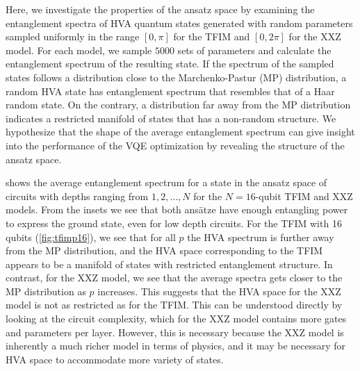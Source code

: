 \documentclass[
 aps,
 pra,
 showpacs,
 showkeys,
 superscriptaddress,
 reprint,%
twocolumn,
]{revtex4-1}
\begin{document}
Here, we investigate the properties of the ansatz space by examining the entanglement spectra of HVA quantum states generated with random parameters sampled uniformly in the range $[0,\pi]$ for the TFIM and $[0,2\pi]$ for the XXZ model. For each model, we sample $5000$ sets of parameters and calculate the entanglement spectrum of the resulting state. If the spectrum of the sampled states follows a distribution close to the Marchenko-Pastur (MP) distribution, a random HVA state has entanglement spectrum that resembles that of a Haar random state. On the contrary, a distribution far away from the MP distribution indicates a restricted manifold of states that has a non-random structure. We hypothesize that the shape of the average entanglement spectrum can give insight into the performance of the VQE optimization by revealing the structure of the ansatz space.


 shows the average entanglement spectrum for a state in the ansatz space of circuits with depths ranging from $1,2,\ldots,N$ for the $N=16$-qubit TFIM and XXZ models. From the insets we see that both ans\"atze have enough entangling power to express the ground state, even for low depth circuits. For the TFIM with 16 qubits (\cref{fig:tfimp16}), we see that for all $p$ the HVA spectrum is further away from the MP distribution, and the HVA space corresponding to the TFIM appears to be a manifold of states with restricted entanglement structure. In contrast, for the XXZ model, we see that the average spectra gets closer to the MP distribution as $p$ increases. This suggests that the HVA space for the XXZ model is not as restricted as for the TFIM. This can be understood directly by looking at the circuit complexity, which for the XXZ model contains more gates and parameters per layer. However, this is necessary because the XXZ model is inherently a much richer model in terms of physics, and it may be necessary for HVA space to accommodate more variety of states.
\end{document}
